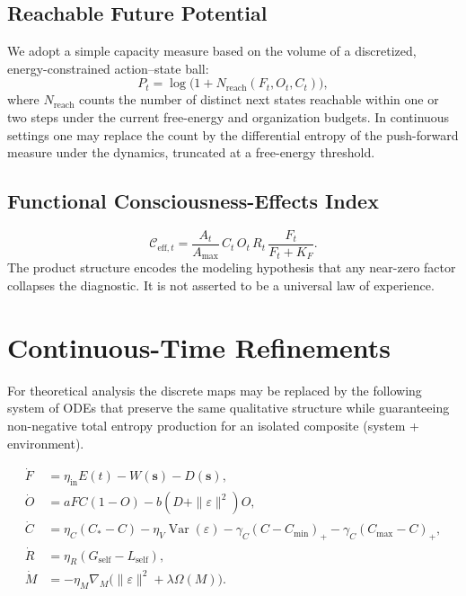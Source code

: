 \documentclass[11pt,a4paper]{article}
\begin{document}
\subsection{Reachable Future Potential}

We adopt a simple capacity measure based on the volume of a discretized, energy-constrained action--state ball:
\begin{equation}
  P_t = \log\bigl(1 + N_{\mathrm{reach}}(F_t,O_t,C_t)\bigr),
  \label{eq:pot}
\end{equation}
where \(N_{\mathrm{reach}}\) counts the number of distinct next states reachable within one or two steps under the current free-energy and organization budgets. In continuous settings one may replace the count by the differential entropy of the push-forward measure under the dynamics, truncated at a free-energy threshold.

\subsection{Functional Consciousness-Effects Index}

\begin{equation}
  \mathcal{C}_{\mathrm{eff},t} = \frac{A_t}{A_{\max}}\, C_t\, O_t\, R_t\, \frac{F_t}{F_t + K_F}.
  \label{eq:Ceff}
\end{equation}
The product structure encodes the modeling hypothesis that any near-zero factor collapses the diagnostic. It is not asserted to be a universal law of experience.

\section{Continuous-Time Refinements}

For theoretical analysis the discrete maps may be replaced by the following system of ODEs that preserve the same qualitative structure while guaranteeing non-negative total entropy production for an isolated composite (system + environment).

\begin{align}
  \dot F &= \eta_{\mathrm{in}} E(t) - W(\mathbf{s}) - D(\mathbf{s}), \label{eq:Fdot}\\
  \dot O &= a F C (1-O) - b (D + \|\varepsilon\|^2) O, \label{eq:Odot}\\
  \dot C &= \eta_C (C_* - C) - \eta_V \operatorname{Var}(\varepsilon) - \gamma_C (C - C_{\min})_+ - \gamma_C (C_{\max} - C)_+, \label{eq:Cdot}\\
  \dot R &= \eta_R (G_{\mathrm{self}} - L_{\mathrm{self}}), \label{eq:Rdot}\\
  \dot M &= -\eta_M \nabla_M \bigl( \|\varepsilon\|^2 + \lambda \Omega(M) \bigr). \label{eq:Mdot}
\end{align}
\end{document}
